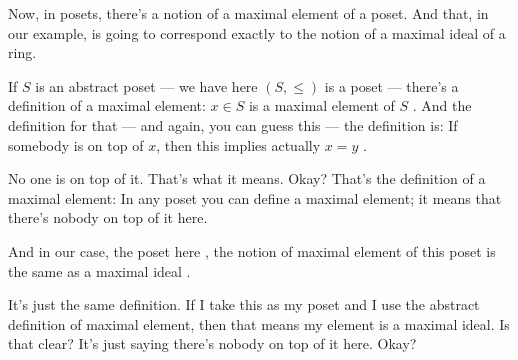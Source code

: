 \begin{speech}[00:32:38 - 00:33:55]
Now, in posets, there's a notion of a maximal element of a poset. And that, in our example, is going to correspond exactly to the notion of a maximal ideal of a ring.

If $S$ is an abstract poset --- we have here $(S, \le)$ is a poset  --- there's a definition of a maximal element: $x \in S$ is a maximal element of $S$ . And the definition for that --- and again, you can guess this --- the definition is: If somebody is on top of $x$, then this implies actually $x = y$ .

No one is on top of it. That's what it means. Okay? That's the definition of a maximal element: In any poset you can define a maximal element; it means that there's nobody on top of it here.
\end{speech}

\begin{speech}[00:33:55 - 00:34:33]
And in our case, the poset here , the notion of maximal element of this poset is the same as a maximal ideal .

It's just the same definition. If I take this as my poset and I use the abstract definition of maximal element, then that means my element is a maximal ideal. Is that clear? It's just saying there's nobody on top of it here. Okay?
\end{speech}

